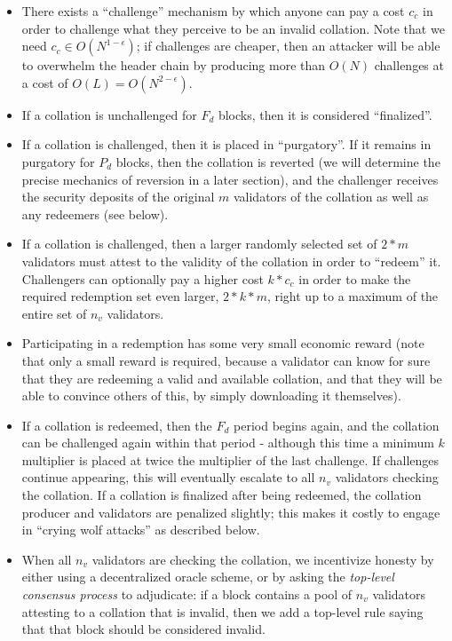 \documentclass[11pt,a4paper]{article}
\theoremstyle{plain}
\theoremstyle{definition}
\theoremstyle{remark}
\begin{document}
\begin{itemize}
\item
There exists a ``challenge'' mechanism by which anyone can pay a cost $c_c$ in order to challenge what they perceive to be an invalid collation. Note that we need $c_c \in O(N^{1-\epsilon})$; if challenges are cheaper, then an attacker will be able to overwhelm the header chain by producing more than $O(N)$ challenges at a cost of $O(L) = O(N^{2-\epsilon})$.
\item
If a collation is unchallenged for $F_d$ blocks, then it is considered ``finalized''.
\item
If a collation is challenged, then it is placed in ``purgatory''. If it remains in purgatory for $P_d$ blocks, then the collation is reverted (we will determine the precise mechanics of reversion in a later section), and the challenger receives the security deposits of the original $m$ validators of the collation as well as any redeemers (see below).
\item
If a collation is challenged, then a larger randomly selected set of $2 * m$ validators must attest to the validity of the collation in order to ``redeem'' it. Challengers can optionally pay a higher cost $k * c_c$ in order to make the required redemption set even larger, $2 * k * m$, right up to a maximum of the entire set of $n_v$ validators.
\item
Participating in a redemption has some very small economic reward (note that only a small reward is required, because a validator can know for sure that they are redeeming a valid and available collation, and that they will be able to convince others of this, by simply downloading it themselves).
\item
If a collation is redeemed, then the $F_d$ period begins again, and the collation can be challenged again within that period - although this time a minimum $k$ multiplier is placed at twice the multiplier of the last challenge. If challenges continue appearing, this will eventually escalate to all $n_v$ validators checking the collation. If a collation is finalized after being redeemed, the collation producer and validators are penalized slightly; this makes it costly to engage in ``crying wolf attacks'' as described below.
\item
When all $n_v$ validators are checking the collation, we incentivize honesty by either using a decentralized oracle scheme, or by asking the \emph{top-level consensus process} to adjudicate: if a block contains a pool of $n_v$ validators attesting to a collation that is invalid, then we add a top-level rule saying that that block should be considered invalid.
\end{itemize}
\end{document}

